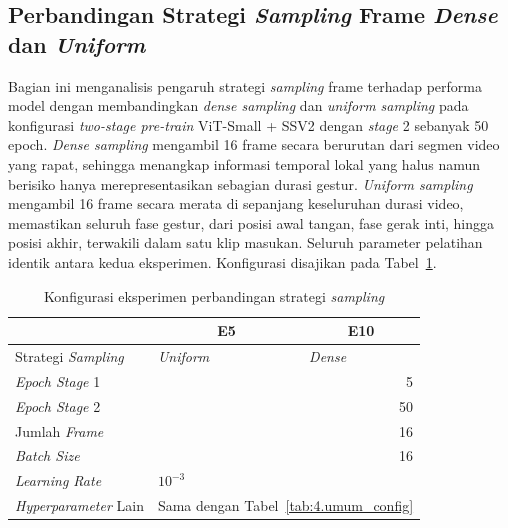 \subsection{Perbandingan Strategi \textit{Sampling} Frame \textit{Dense} dan \textit{Uniform}} \label{IV.Sek3}

Bagian ini menganalisis pengaruh strategi \textit{sampling} frame terhadap performa model dengan membandingkan \textit{dense sampling} dan \textit{uniform sampling} pada konfigurasi \textit{two-stage pre-train} ViT-Small + SSV2 dengan \textit{stage} 2 sebanyak 50 epoch. \textit{Dense sampling} mengambil 16 frame secara berurutan dari segmen video yang rapat, sehingga menangkap informasi temporal lokal yang halus namun berisiko hanya merepresentasikan sebagian durasi gestur. \textit{Uniform sampling} mengambil 16 frame secara merata di sepanjang keseluruhan durasi video, memastikan seluruh fase gestur, dari posisi awal tangan, fase gerak inti, hingga posisi akhir, terwakili dalam satu klip masukan. Seluruh parameter pelatihan identik antara kedua eksperimen. Konfigurasi disajikan pada Tabel~\ref{tab:4.s4_config}.\par

\begin{table}[H]
\centering
\caption{Konfigurasi eksperimen perbandingan strategi \textit{sampling}}
\label{tab:4.s4_config}
{\setlength{\tabcolsep}{3pt}
\footnotesize
\begin{tabular}{|l|r|r|}
\hline
\rowcolor{gray!15} \multicolumn{1}{|l|}{\textbf{Parameter}} & \multicolumn{1}{c|}{\cellcolor{gray!15}\textbf{E5}} & \multicolumn{1}{c|}{\cellcolor{gray!15}\textbf{E10}} \\
\hline
Strategi \textit{Sampling} & \multicolumn{1}{l|}{\textit{Uniform}} & \multicolumn{1}{l|}{\textit{Dense}} \\
\hline
\textit{Epoch Stage} 1 & \multicolumn{2}{r|}{5} \\
\hline
\textit{Epoch Stage} 2 & \multicolumn{2}{r|}{50} \\
\hline
Jumlah \textit{Frame} & \multicolumn{2}{r|}{16} \\
\hline
\textit{Batch Size} & \multicolumn{2}{r|}{16} \\
\hline
\textit{Learning Rate} & \multicolumn{2}{l|}{$10^{-3}$} \\
\hline
\textit{Hyperparameter} Lain & \multicolumn{2}{c|}{Sama dengan Tabel~\ref{tab:4.umum_config}} \\
\hline
\end{tabular}
}
\end{table}

